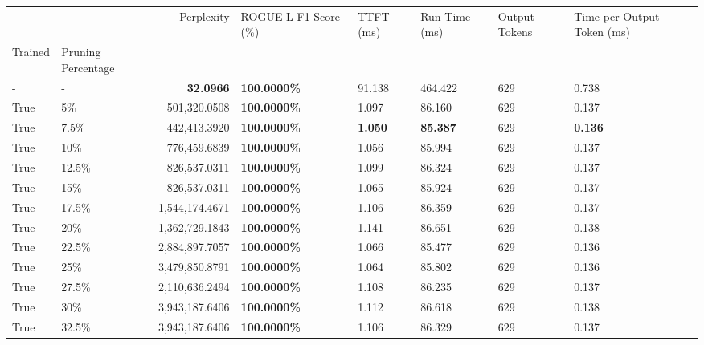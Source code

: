 \begin{table}[H]
\label{tab:evaluation-pipeline-1-trained}
\begin{tabular}{|m{}| m{}| r | R{0.13\textwidth}| R{0.09\textwidth}| R{0.09\textwidth}| R{0.1\textwidth}| R{0.11\textwidth}|}
\toprule
 &  & Perplexity & ROGUE-L F1 Score (\%) & TTFT (ms) & Run Time (ms) & Output Tokens & Time per Output Token (ms) \\
Trained & Pruning Percentage &  &  &  &  &  &  \\
\midrule
- & - & \bfseries 32.0966 & \bfseries 100.0000\% & 91.138 & 464.422 & 629 & 0.738 \\
 
True & 5\% & 501,320.0508 & \bfseries \color{red} 100.0000\% & 1.097 & 86.160 & 629 & 0.137 \\
 
True & 7.5\% & 442,413.3920 & \bfseries \color{red} 100.0000\% & \bfseries \color{red} 1.050 & \bfseries \color{red} 85.387 & 629 & \bfseries \color{red} 0.136 \\
 
True & 10\% & 776,459.6839 & \bfseries \color{red} 100.0000\% & 1.056 & 85.994 & 629 & 0.137 \\
 
True & 12.5\% & 826,537.0311 & \bfseries \color{red} 100.0000\% & 1.099 & 86.324 & 629 & 0.137 \\
 
True & 15\% & 826,537.0311 & \bfseries \color{red} 100.0000\% & 1.065 & 85.924 & 629 & 0.137 \\
 
True & 17.5\% & 1,544,174.4671 & \bfseries \color{red} 100.0000\% & 1.106 & 86.359 & 629 & 0.137 \\
 
True & 20\% & 1,362,729.1843 & \bfseries \color{red} 100.0000\% & 1.141 & 86.651 & 629 & 0.138 \\
 
True & 22.5\% & 2,884,897.7057 & \bfseries \color{red} 100.0000\% & 1.066 & 85.477 & 629 & 0.136 \\
 
True & 25\% & 3,479,850.8791 & \bfseries \color{red} 100.0000\% & 1.064 & 85.802 & 629 & 0.136 \\
 
True & 27.5\% & 2,110,636.2494 & \bfseries \color{red} 100.0000\% & 1.108 & 86.235 & 629 & 0.137 \\
 
True & 30\% & 3,943,187.6406 & \bfseries \color{red} 100.0000\% & 1.112 & 86.618 & 629 & 0.138 \\
 
True & 32.5\% & 3,943,187.6406 & \bfseries \color{red} 100.0000\% & 1.106 & 86.329 & 629 & 0.137 \\

\end{tabular}
\end{table}
